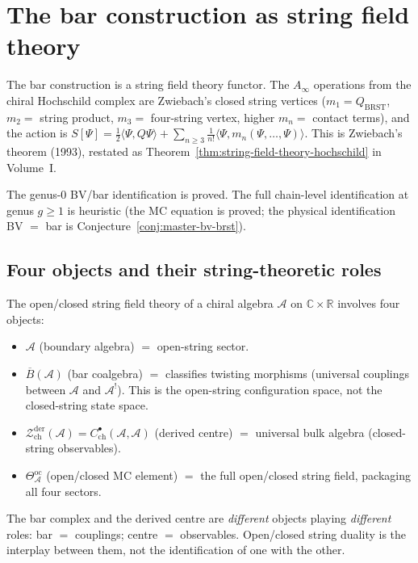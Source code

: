 \documentclass[11pt]{article}
\newcommand{\cA}{\mathcal{A}}
\newcommand{\cZ}{\mathcal{Z}}
\newcommand{\barB}{\overline{B}}
\newcommand{\C}{\mathbb{C}}
\newcommand{\R}{\mathbb{R}}
\newcommand{\Zder}{\cZ^{\mathrm{der}}_{\mathrm{ch}}}
\begin{document}
\section{The bar construction as string field theory}
\label{sec:bar-sft}

The bar construction is a string field theory functor.  The
$A_\infty$ operations from the chiral Hochschild complex are
Zwiebach's closed string vertices ($m_1 = Q_{\mathrm{BRST}}$,
$m_2 =$ string product, $m_3 =$ four-string vertex, higher
$m_n =$ contact terms), and the action is
$S[\Psi] = \frac{1}{2}\langle\Psi, Q\Psi\rangle
+ \sum_{n \geq 3} \frac{1}{n!}
  \langle\Psi, m_n(\Psi,\ldots,\Psi)\rangle$.
This is Zwiebach's theorem (1993), restated as
Theorem~\ref{thm:string-field-theory-hochschild} in Volume~I.

The genus-$0$ BV/bar identification is proved.  The full
chain-level identification at genus $g \geq 1$ is heuristic
(the MC equation is proved; the physical identification
BV $=$ bar is Conjecture~\ref{conj:master-bv-brst}).

\subsection{Four objects and their string-theoretic roles}

The open/closed string field theory of a chiral algebra $\cA$
on $\C \times \R$ involves four objects:
\begin{itemize}[nosep]
\item $\cA$ (boundary algebra) $=$ open-string sector.
\item $\barB(\cA)$ (bar coalgebra) $=$ classifies twisting
  morphisms (universal couplings between $\cA$ and $\cA^!$).
  This is the open-string configuration space, not the
  closed-string state space.
\item $\Zder(\cA) = C^\bullet_{\mathrm{ch}}(\cA,\cA)$
  (derived centre) $=$ universal bulk algebra (closed-string
  observables).
\item $\Theta^{\mathrm{oc}}_\cA$ (open/closed MC element) $=$
  the full open/closed string field, packaging all four sectors.
\end{itemize}
The bar complex and the derived centre are \emph{different}
objects playing \emph{different} roles:
bar $=$ couplings; centre $=$ observables.
Open/closed string duality is the interplay between them, not
the identification of one with the other.
\end{document}
